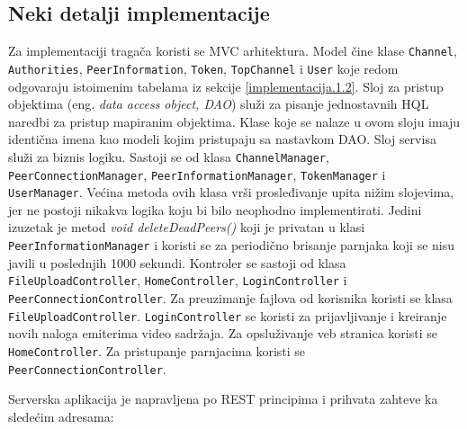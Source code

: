 \documentclass[12pt,oneside]{memoir}
\begin{document}
\subsection{Neki detalji implementacije}
\label{implementacija.1.3}

Za implementaciji tragača koristi se MVC arhitektura. Model čine klase \texttt{Channel}, \texttt{Authorities}, \texttt{PeerInformation}, \texttt{Token}, \texttt{TopChannel} i \texttt{User} koje redom odgovaraju istoimenim tabelama iz sekcije \ref{implementacija.1.2}. Sloj za pristup objektima (eng. \textit{data access object, DAO}) služi za pisanje jednostavnih HQL naredbi za pristup mapiranim objektima. Klase koje se nalaze u ovom sloju imaju identična imena kao modeli kojim pristupaju sa nastavkom DAO. Sloj servisa služi za biznis logiku. Sastoji se od klasa \texttt{ChannelManager}, \texttt{PeerConnectionManager}, \texttt{PeerInformationManager}, \texttt{TokenManager} i \texttt{UserManager}. Većina metoda ovih klasa vrši prosleđivanje upita nižim slojevima, jer ne postoji nikakva logika koju bi bilo neophodno implementirati. Jedini izuzetak je metod \textit{void deleteDeadPeers()} koji je privatan u klasi \texttt{PeerInformationManager} i koristi se za periodično brisanje parnjaka koji se nisu javili u poslednjih 1000 sekundi. Kontroler se sastoji od klasa \texttt{FileUploadController}, \texttt{HomeController}, \texttt{LoginController} i \texttt{PeerConnectionController}. Za preuzimanje fajlova od korisnika koristi se klasa \texttt{FileUploadController}. \texttt{LoginController} se koristi za prijavljivanje i kreiranje novih naloga emiterima video sadržaja.
Za opsluživanje veb stranica koristi se \texttt{HomeController}. Za pristupanje parnjacima koristi se \texttt{PeerConnectionController}.

Serverska aplikacija je napravljena po REST principima i prihvata zahteve ka
sledećim adresama:
\end{document}
